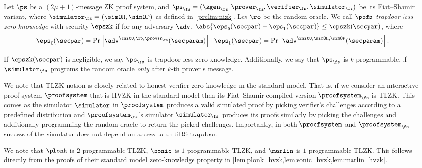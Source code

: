 \begin{definition}
  \label{def:TLZK}
  Let $\ps$ be a $(2\mu + 1)$-message ZK proof system, and
  $\ps_\fs= (\kgen_{\fs}, \prover_{\fs}, \verifier_{\fs}, \simulator_{\fs})$ be its
  Fiat--Shamir variant, where $\simulator_{\fs} = (\simOH, \simOP)$ as defined in~\cref{prelim:nizk}. Let $\ro$ be the random oracle. 
  We call $\psfs$ \emph{trapdoor-less zero-knowledge} with security $\epszk$ if for any
  adversary $\adv$, $\abs{\eps_0(\secpar) - \eps_1(\secpar)} \leq \epszk(\secpar)$, where
  \begin{align*}
    \eps_0 (\secpar) = \Pr\left[ \adv^{\initU, \ro, \prover_{\fs}} (\secparam) \right],\,
    \eps_1 (\secpar)=  \Pr \left[\adv^{\initU, \simOH, \simOP} (\secparam) \right].
  \end{align*}
  
  If $\epszk(\secpar)$ is negligible, we say $\ps_{\fs}$ is trapdoor-less zero-knowledge. Additionally, we say that $\ps_{\fs}$ is $k$-programmable, if $\simulator_\fs$
  programs the random oracle \emph{only} after $k$-th prover's message.
  \end{definition}

  
\begin{remark}
  We note that TLZK notion is closely related to honest-verifier zero knowledge in the
  standard model. That is, if we consider an interactive proof system $\proofsystem$
  that is HVZK in the standard model then its Fiat--Shamir compiled version
  $\proofsystem_\fs$ is TLZK. This comes as the simulator $\simulator$ in
  $\proofsystem$ produces a valid simulated proof by picking verifier's challenges
  according to a predefined distribution and $\proofsystem_\fs$'s simulator
  $\simulator_\fs$ produces its proofs similarly by picking the challenges and
  additionally programming the random oracle to return the picked
  challenges. Importantly, in both $\proofsystem$ and $\proofsystem_\fs$ success of
  the simulator does not depend on access to an SRS trapdoor.
\end{remark}

We note that $\plonk$ is $2$-programmable TLZK, $\sonic$ is $1$-programmable TLZK,
and $\marlin$ is $1$-programmable TLZK. This follows directly from the proofs of
their standard model zero-knowledge property in
\cref{lem:plonk_hvzk,lem:sonic_hvzk,lem:marlin_hvzk}. 

